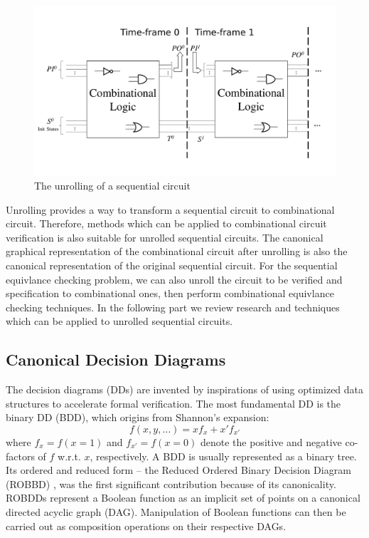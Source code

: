 \begin{figure}[h]
\centerline{
\includegraphics[width=\textwidth]{newfig/unroll.pdf}
}
\caption{The unrolling of a sequential circuit}
\label{fig:unrolling}
\end{figure}

Unrolling provides a way to transform a sequential circuit to combinational 
circuit. Therefore,  methods which can be applied to combinational circuit 
verification is also suitable for unrolled sequential circuits. The canonical 
graphical representation of the combinational circuit after unrolling is also 
the canonical representation of the original sequential circuit. For the sequential 
equivlance checking problem, we can also unroll the circuit to be verified and 
specification to combinational ones, then perform combinational equivlance checking
techniques. In the following part we review research and techniques which 
can be applied to unrolled sequential circuits.

\subsection{Canonical Decision Diagrams}
The decision diagrams (DDs) are invented by inspirations of 
using optimized data structures to accelerate formal verification.
The most fundamental DD is the binary DD (BDD), which origins from 
Shannon's expansion:
\begin{equation}
f(x, y, \dots) = x f_x + x' f_{x'}
\end{equation}
where $f_x = f(x = 1)$ and $f_{x'} = f(x = 0)$ denote the positive and
negative co-factors of $f$ w.r.t. $x$, respectively.
A BDD is usually represented as a binary tree.
Its ordered and reduced form -- the Reduced Ordered Binary Decision Diagram (ROBBD)
\cite{BRYA86}, was the first significant contribution because of its canonicality.  
 ROBDDs represent a Boolean function as an
implicit set of points on a canonical directed acyclic graph
(DAG). Manipulation of Boolean functions can then be carried out as
composition operations on their respective DAGs. 


